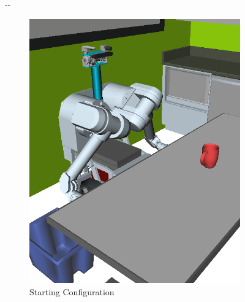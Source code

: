 \documentclass{report}
\newlength{\offsetpage}
\newenvironment{widepage}
   {\begin{adjustwidth}{-\offsetpage}{-\offsetpage}%
    \addtolength{\textwidth}{2\offsetpage}}%
{\end{adjustwidth}}
\begin{document}
\begin{figure}
\begin{widepage}
\centering

\begin{subfigure}[t]{0.185\linewidth}
\centering
\includegraphics[width=\columnwidth]{figs/testherb-a.png}
\caption{Starting Configuration}
\end{subfigure}
\begin{subfigure}[t]{0.185\linewidth}
\centering

\end{subfigure}
\end{widepage}
\end{figure}
\end{document}
